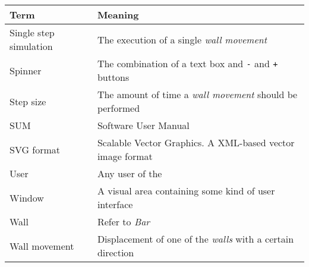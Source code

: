 \begin{tabularx}{\textwidth}{lX}
    \toprule
    \textbf{Term} & \textbf{Meaning} \\
    \midrule
    Single step simulation & The execution of a single \emph{wall movement} \\
    Spinner & The combination of a text box and \texttt{-} and \texttt{+} buttons \\
    Step size & The amount of time a \emph{wall movement} should be performed \\
    SUM & Software User Manual \\
    SVG format & Scalable Vector Graphics. A XML-based vector image format \\
    User & Any user of the \applicationname{} \\
    Window & A visual area containing some kind of user interface \\
    Wall & Refer to \emph{Bar} \\
    Wall movement & Displacement of one of the \emph{walls} with a certain direction \\
    \bottomrule
\end{tabularx}




